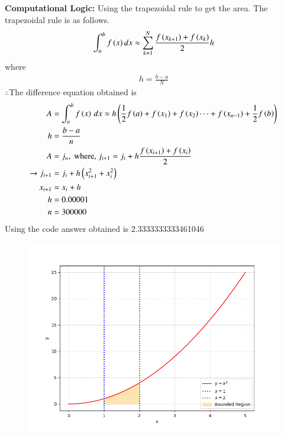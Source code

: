 \documentclass[journal]{IEEEtran}
\begin{document}
\begin{enumerate}
\textbf{Computational Logic:} 
Using the trapezoidal rule to get the area. The trapezoidal rule is as follows.
\begin{align}
    \int^{b}_{a} f\left(x\right)dx\approx \sum^{N}_{k=1}\frac{f\left(x_{k+1}\right)+f\left(x_{k}\right)}{2}h
\end{align}
where
\begin{align}
    h=\frac{b-a}{N}
\end{align}
$\therefore$The difference equation obtained is\\
\begin{align}
    A &= \int_a^b f\left(x\right)\, dx \approx h\left(\frac{1}{2}f\left(a\right) + f\left(x_1\right) + f\left(x_2\right) \cdots + f\left(x_{n-1}\right) + \frac{1}{2}f\left(b\right)\right)\\
    h &= \frac{b-a}{n}\\
    A &= j_n, \text{ where, } j_{i + 1} = j_i + h\frac{f\left(x_{i+1}\right) + f\left(x_i\right)}{2}\\ 
        \xrightarrow{} j_{i + 1} &= j_i + h\left({x_{i+1}^2}+{x_{i}^2}\right)\\
    x_{i+1} &= x_i + h\\
    h&=0.00001\\
    n&=300000
\end{align}
Using the code answer obtained is 2.3333333333461046

\begin{figure}[h]
    \centering
    \includegraphics[width=\columnwidth]{figs/fig.png}
 \end{figure}

\end{enumerate}
\end{document}
